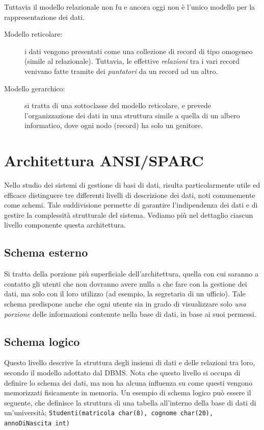 \documentclass[12pt]{report}
\begin{document}
	Tuttavia il modello relazionale non fu e ancora oggi non è l'unico modello per la rappresentazione dei dati.
	\begin{description}
		\item [Modello reticolare:] i dati vengono presentati come una collezione di record di tipo omogeneo (simile al relazionale). Tuttavia, le effettive \textit{relazioni} tra i vari record venivano fatte tramite dei \textit{puntatori} da un record ad un altro.
		
		\item [Modello gerarchico:] si tratta di una sottoclasse del modello reticolare, e prevede l'organizzazione dei dati in una struttura simile a quella di un albero informatico, dove ogni nodo (record) ha solo un genitore.
	\end{description}
	
	\section{Architettura ANSI/SPARC}
	\label{sec:ansi_sparc}
	Nello studio dei sistemi di gestione di basi di dati, risulta particolarmente utile ed efficace distinguere tre differenti livelli di descrizione dei dati, noti comunemente come schemi. Tale suddivisione permette di garantire l'indipendenza dei dati e di gestire la complessità strutturale del sistema.
	Vediamo più nel dettaglio ciascun livello componente questa architettura.
	
	\subsection{Schema esterno}
	Si tratta della porzione più superficiale dell'architettura, quella con cui saranno a contatto gli utenti che non dovranno avere nulla a che fare con la gestione dei dati, ma solo con il loro utilizzo (ad esempio, la segretaria di un ufficio).
	Tale schema predispone anche che ogni utente sia in grado di visualizzare solo \textit{una porzione} delle informazioni contenute nella base di dati, in base ai suoi permessi.
	
	\subsection{Schema logico}
	Questo livello descrive la struttura degli insiemi di dati e delle relazioni tra loro, secondo il modello adottato dal DBMS. Nota che questo livello si occupa di definire lo schema dei dati, ma non ha alcuna influenza su come questi vengono memorizzati fisicamente in memoria.
	Un esempio di schema logico può essere il seguente, che definisce la struttura di una tabella all'interno della base di dati di un'università; \texttt{Studenti(matricola char(8), cognome char(20), annoDiNascita int)}
	
\end{document}
